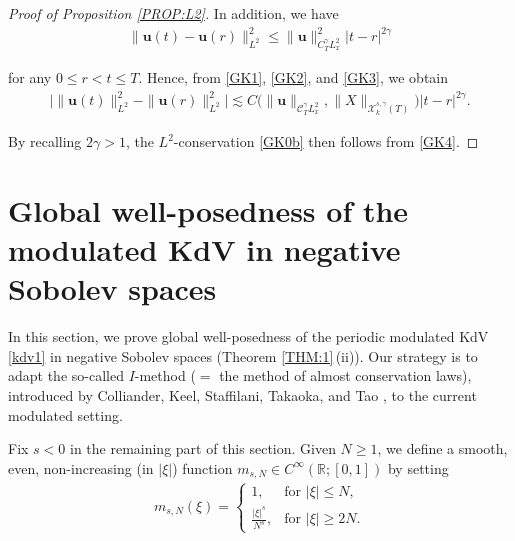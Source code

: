 \documentclass[letterpaper, 11pt,  reqno]{amsart}
\newcommand{\1}{\hspace{0.5mm}\text{I}\hspace{0.5mm}}
\newcommand{\noi}{\noindent}
\newcommand{\R}{\mathbb{R}}
\newcommand{\CC}{\mathcal{C}}
\newcommand{\g}{\gamma}
\newcommand{\cX}{\mathcal{X}}
\newcommand{\uu}{\mathbf{u}}
\numberwithin{equation}{section}
\numberwithin{theorem}{section}
\begin{document}
\begin{proof}[Proof of Proposition \ref{PROP:L2}]
\noi 
In addition, we have 
\begin{align}
\|\uu(t)-\uu(r)\|_{L^2}^2 
\leq 
\|\uu\|_{C^\g_T L^2_x}^2 
|t-r|^{2\g}
\label{GK3}
\end{align}

\noi
for any  $0\leq r<t\leq T$.
Hence, from \eqref{GK1}, \eqref{GK2}, and \eqref{GK3}, 
we obtain 
\begin{align}
\big| 
 \|  \uu(t)  \|^2_{L^2}- 
\| \uu(r)  \|^2_{L^2}
 \big|
 \lesssim
 C\big(\|\uu\|_{\CC^\g_{T} L^2_x},   \|X\|_{\cX^{s, \g}_k(T)}\big)
 |t-r |^{2\g}.
\label{GK4}
\end{align}

\noi
By recalling $2\g > 1$, 
the $L^2$-conservation \eqref{GK0b}
then follows from \eqref{GK4}.
\end{proof}

























\section{Global well-posedness of the modulated KdV in negative Sobolev spaces}
\label{SEC:I}

In this section, we prove global well-posedness of 
the periodic modulated KdV \eqref{kdv1}  in negative Sobolev spaces 
(Theorem \ref{THM:1}\,(ii)).
Our strategy is to adapt 
the so-called $I$-method ($=$ the method of almost conservation laws), 
introduced by Colliander, Keel, Staffilani, Takaoka, and Tao
\cite{CKSTT03}, to the current modulated setting.


Fix   $s<0$
in the remaining part of this section.
 Given $N \geq 1$,
 we define a smooth, even, 
 non-increasing (in $|\xi|$) 
 function 
 $m_{s, N} \in C^\infty(\R; [0, 1])$ 
 by setting
\begin{align}
m_{s, N}(\xi)=
\begin{cases}
1, 
&\text{for }
|\xi|\leq N,   \\
\frac{ |\xi|^s }{ N^s }, 
&\text{for }
|\xi|\geq  2N.
\end{cases}
\label{Iop1}
\end{align}
\end{document}
